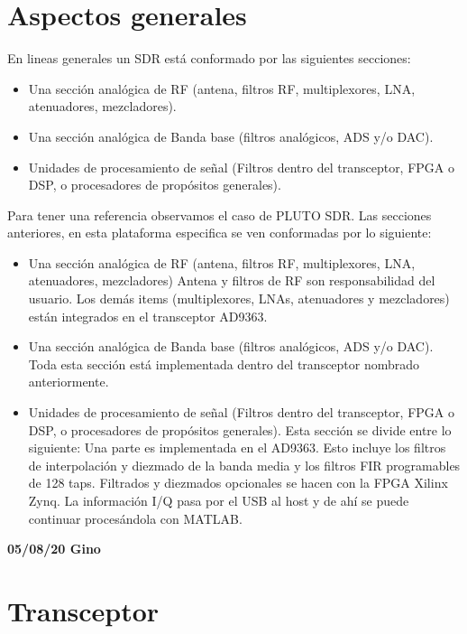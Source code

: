 \documentclass[a4paper,12pt]{report} %
\begin{document}
\section{Aspectos generales} \cite{sdr_engineers}

En lineas generales un SDR está conformado por las siguientes secciones:

\begin{itemize}
	\item Una sección analógica de RF (antena, filtros RF, multiplexores, LNA, atenuadores, mezcladores).
	\item Una sección analógica de Banda base (filtros analógicos, ADS y/o DAC).
	\item Unidades de procesamiento de señal (Filtros dentro del transceptor, FPGA o DSP, o procesadores de propósitos generales).
\end{itemize}

Para tener una referencia observamos el caso de PLUTO SDR. Las secciones anteriores, en esta plataforma especifica se ven conformadas por lo siguiente:

\begin{itemize}
	\item Una sección analógica de RF (antena, filtros RF, multiplexores, LNA, atenuadores, mezcladores)
		\subitem Antena y filtros de RF son responsabilidad del usuario.
		\subitem Los demás items (multiplexores, LNAs, atenuadores y mezcladores) están integrados en el transceptor AD9363.
		
	\item Una sección analógica de Banda base (filtros analógicos, ADS y/o DAC).
		\subitem Toda esta sección está implementada dentro del transceptor nombrado anteriormente.
		 
	\item Unidades de procesamiento de señal (Filtros dentro del transceptor, FPGA o DSP, o procesadores de propósitos generales). Esta sección se divide entre lo siguiente:
		\subitem Una parte es implementada en el AD9363. Esto  incluye los filtros de interpolación y diezmado de la banda media y los filtros FIR programables de 128 taps.
		\subitem Filtrados y diezmados opcionales se hacen con la FPGA Xilinx Zynq.
		\subitem La información I/Q pasa por el USB al host y de ahí se puede continuar procesándola con MATLAB.
\end{itemize}

\textbf{05/08/20 Gino}
\section{Transceptor}
\end{document}
